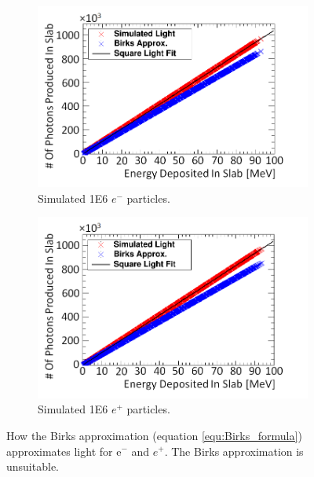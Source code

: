 \begin{figure}[htbp]
\centering
\begin{subfigure}{.5\textwidth}
  \centering
  \includegraphics[width=\linewidth]{Chapter4/Figs/Raster/electronSimulatedLightNew.png}
  \captionsetup{width=.9\linewidth}
  \caption{Simulated 1E6 $e^-$ particles.}
  \label{subfig:append5_light_of_electrons0-100mev}
\end{subfigure}%
\begin{subfigure}{.5\textwidth}
  \centering
  \includegraphics[width=\linewidth]{Chapter4/Figs/Raster/positronSimulatedLightNew.png}
  \captionsetup{width=.9\linewidth}
  \caption{Simulated 1E6 $e^+$ particles.}
  \label{subfig:append5_light_of_positrons0-100mev}
\end{subfigure}
\caption{How the Birks approximation (equation \ref{equ:Birks_formula}) approximates light for e$^-$ and $e^+$. The Birks approximation is unsuitable.}
\label{fig:append5_light_of_electrons_positrons0-100mev}
\end{figure}

